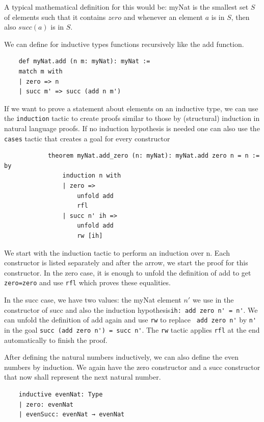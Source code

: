 A typical mathematical definition for this would be: myNat is the smallest set $S$ of elements such that it contains $zero$ and whenever an element $a$ is in $S$, then also $succ(a)$ is in $S$.

We can define for inductive types functions recursively like the add function.

\begin{lstlisting}
    def myNat.add (n m: myNat): myNat :=
    match m with
    | zero => n
    | succ m' => succ (add n m')
\end{lstlisting}

If we want to prove a statement about elements on an inductive type, we can use the \lstinline|induction| tactic to create proofs similar to those by (structural) induction in natural language proofs. If no induction hypothesis is needed one can also use the \lstinline|cases| tactic that creates a goal for every constructor

\begin{lstlisting}
            theorem myNat.add_zero (n: myNat): myNat.add zero n = n := by
                induction n with
                | zero =>
                    unfold add
                    rfl
                | succ n' ih =>
                    unfold add
                    rw [ih]
\end{lstlisting}

We start with the induction tactic to perform an induction over n. Each constructor is listed separately and after the arrow, we start the proof for this constructor. In the zero case, it is enough to unfold the definition of add to get \lstinline|zero=zero| and use \lstinline|rfl| which proves these equalities.

In the succ case, we have two values:  the myNat element $n'$ we use in the constructor of succ and also the induction hypothesis\lstinline|ih: add zero n' = n'|. We can unfold the definition of add again and use \lstinline|rw| to replace \lstinline| add zero n'| by \lstinline|n'| in the goal \lstinline|succ (add zero n') = succ n'|. The \lstinline|rw| tactic applies \lstinline|rfl| at the end automatically to finish the proof.

After defining the natural numbers inductively, we can also define the even numbers by induction. We again have the zero constructor and a succ constructor that now shall represent the next natural number.

\begin{lstlisting}
    inductive evenNat: Type
    | zero: evenNat
    | evenSucc: evenNat → evenNat
\end{lstlisting}

